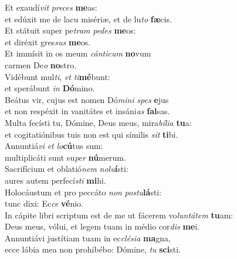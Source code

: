\evenverse Et exaudí\textit{vit} \textit{pre}\textit{ces} \textbf{me}as:~\*\\
\evenverse et edúxit me de lacu misériæ, et de lu\textit{to} \textbf{fæ}cis.\\
\oddverse Et státuit super pe\textit{tram} \textit{pe}\textit{des} \textbf{me}os:~\*\\
\oddverse et diréxit gres\textit{sus} \textbf{me}os.\\
\evenverse Et immísit in os meum \textit{cán}\textit{ti}\textit{cum} \textbf{no}vum~\*\\
\evenverse carmen De\textit{o} \textbf{no}stro.\\
\oddverse Vidébunt mul\textit{ti}, \textit{et} \textit{ti}\textbf{mé}bunt:~\*\\
\oddverse et sperábunt \textit{in} \textbf{Dó}mino.\\
\evenverse Beátus vir, cujus est nomen Dó\textit{mi}\textit{ni} \textit{spes} \textbf{e}jus~\*\\
\evenverse et non respéxit in vanitátes et insáni\textit{as} \textbf{fal}sas.\\
\oddverse Multa fecísti tu, Dómine, Deus meus, mira\textit{bí}\textit{li}\textit{a} \textbf{tu}a:~\*\\
\oddverse et cogitatiónibus tuis non est qui símilis \textit{sit} \textbf{ti}bi.\\
\evenverse Annuntiá\textit{vi} \textit{et} \textit{lo}\textbf{cú}tus sum:~\*\\
\evenverse multiplicáti sunt su\textit{per} \textbf{nú}merum.\\
\oddverse Sacrifícium et oblatió\textit{nem} \textit{no}\textit{lu}\textbf{í}sti:~\*\\
\oddverse aures autem perfecí\textit{sti} \textbf{mi}hi.\\
\evenverse Holocáustum et pro peccáto \textit{non} \textit{po}\textit{stu}\textbf{lá}sti:~\*\\
\evenverse tunc dixi: Ec\textit{ce} \textbf{vé}nio.\\
\oddverse In cápite libri scriptum est de me ut fácerem vo\textit{lun}\textit{tá}\textit{tem} \textbf{tu}am:~\*\\
\oddverse Deus meus, vólui, et legem tuam in médio cor\textit{dis} \textbf{me}i.\\
\evenverse Annuntiávi justítiam tuam in ec\textit{clé}\textit{si}\textit{a} \textbf{ma}gna,~\*\\
\evenverse ecce lábia mea non prohibébo: Dómine, \textit{tu} \textbf{sci}sti.\\
